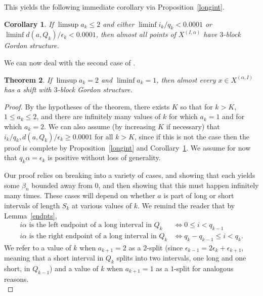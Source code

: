 \documentclass[11pt,reqno]{amsart}
\newtheorem{theorem}{Theorem}[section]
\newtheorem{corollary}[theorem]{Corollary}
\theoremstyle{definition}
\theoremstyle{plain}
\begin{document}
This yields the following immediate corollary via Proposition~\ref{longint}. 

\begin{corollary}\label{bdaway}
If $\limsup a_k \leq 2$ and either $\liminf i_k/q_k < 0.0001$ or $\liminf d(a, Q_k)/\epsilon_k < 0.0001$, then almost all points of $X^{(I, \alpha)}$ have $3$-block Gordon structure.
\end{corollary}

We can now deal with the second case of .

\begin{theorem}\label{onetwo}
If $\limsup a_k = 2$ and $\liminf a_k = 1$, then almost every $x \in X^{(\alpha, I)}$ has a shift with $3$-block Gordon structure.
\end{theorem}

\begin{proof}
By the hypotheses of the theorem, there exists $K$ so that for $k > K$, $1 \leq a_k \leq 2$, and there are infinitely many values of $k$ for which $a_k = 1$ and for which $a_k = 2$. We can also assume (by increasing $K$ if necessary) that
$i_k/q_k, d(a, Q_k)/\epsilon_k \geq 0.0001$ for all $k > K$, since if this is not the case then the proof is complete by 
Proposition~\ref{longint} and Corollary~\ref{bdaway}. We assume for now that $q_k \alpha = \epsilon_k$ is positive without loss of generality.

Our proof relies on breaking into a variety of cases, and showing that each yields some $\beta_n$ bounded away from $0$, and then showing that this must happen infinitely many times. These cases will depend on whether $a$ is part of long or short intervals of length $S_k$ at various values of $k$. We remind the reader that by Lemma~\ref{endpts},
\begin{align*}
i \alpha \textrm{ is the left endpoint of a long interval in } Q_k & \Longleftrightarrow 0 \leq i < q_{k-1}\\
i \alpha \textrm{ is the right endpoint of a long interval in } Q_k & \Longleftrightarrow q_k - q_{k-1} \leq i < q_{k}.
\end{align*}
We refer to a value of $k$ when $a_{k+1} = 2$ as a $2$-split (since $\epsilon_{k-1} = 2\epsilon_{k} + \epsilon_{k+1}$, meaning that a short interval in $Q_k$ splits into two intervals, one long and one short, in $Q_{k-1}$) and a value of $k$ when $a_{k+1} = 1$ as a $1$-split for analogous reasons.\\


\end{proof}
\end{document}
